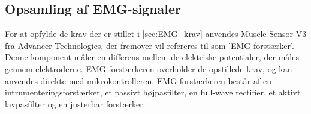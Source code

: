 


\subsection{Opsamling af EMG-signaler} \label{sec:EMG_krav}
For at opfylde de krav der er stillet i \autoref{sec:EMG_krav} anvendes Muscle Sensor V3 fra Advancer Technologies, der fremover vil refereres til som 'EMG-forstærker'. Denne komponent måler en differens mellem de elektriske potentialer, der måles gennem elektroderne. EMG-forstærkeren overholder de opstillede krav, og kan anvendes direkte med mikrokontrolleren. EMG-forstærkeren består af en intrumenteringsforstærker, et passivt højpasfilter, en full-wave rectifier, et aktivt lavpasfilter og en justerbar forstærker \citep{advancertech2013}. 

